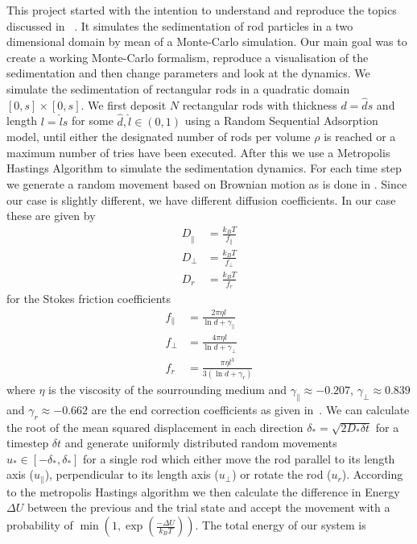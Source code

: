 This project started with the intention to understand and reproduce the topics discussed in ~\cite{SED}. It simulates the sedimentation of rod particles in a two dimensional domain by mean of a Monte-Carlo simulation. Our main goal was to create a working Monte-Carlo formalism, reproduce a visualisation of the sedimentation and then change parameters and look at the dynamics.
We simulate the sedimentation of rectangular rods in a quadratic domain $[0,s]×[0,s]$. We first deposit $N$ rectangular rods with thickness $d = \hat ds$ and length $l = \hat ls$ for some $\hat d,\hat l∈(0,1)$ using a Random Sequential Adsorption model, until either the designated number of rods per volume $ρ$ is reached or a maximum number of tries have been executed. After this we use a Metropolis Hastings Algorithm to simulate the sedimentation dynamics. For each time step we generate a random movement based on Brownian motion as is done in \cite{BD}. Since our {\color{red} case} is slightly different, we have different diffusion coefficients. In our case these are given by
\begin{equation}
  \begin{array}{RLL}
    D_‖ &= \frac{k_BT}{f_\|}\\
    D_\perp &= \frac{k_BT}{f_\perp}\\
    D_r &= \frac{k_BT}{f_r}
  \end{array}
\end{equation}
for the Stokes friction coefficients
\begin{equation}
  \begin{array}{RLL}
    f_\| &= \frac{2πηl}{\ln d + γ_\|}\\
    f_\perp &= \frac{4πηl}{\ln d + γ_\perp}\\
    f_r &= \frac{πηl^3}{3(\ln d+γ_r)}
  \end{array}
\end{equation}
where $η$ is the viscosity of the sourrounding medium and $γ_\| \approx -0.207$, $γ_\perp\approx0.839$ and $γ_r\approx-0.662$ are the end correction coefficients as given in~\cite{SED}.
We can calculate the root of the mean squared displacement in each direction $δ_* = \sqrt{2D_*δt}$ for a timestep $δt$ and generate uniformly distributed random movements $u_*∈[-δ_*,δ_*]$ for a single rod which either move the rod parallel to its length axis ($u_\|$), perpendicular to its length axis ($u_\perp$) or rotate the rod ($u_r$). According to the metropolis Hastings algorithm we then calculate the difference in Energy $ΔU$ between the previous and the trial state and accept the movement with a probability of $\min(1,\exp(\frac{-ΔU}{k_BT}))$. The total energy of our system is
